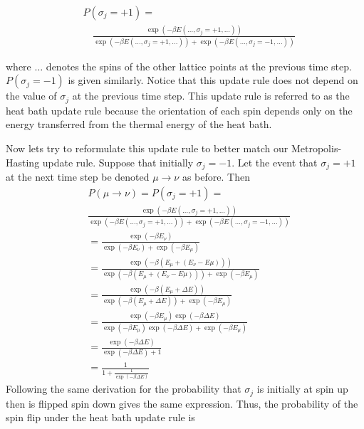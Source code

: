\documentclass{article}
\begin{document}
\begin{equation}
    \begin{split}
    &P(\sigma_j = +1) = \\
    &\quad \frac{\exp(-\beta E(\ldots, \sigma_j = +1, \ldots))}{\exp(-\beta E(\ldots, \sigma_j = +1, \ldots)) + \exp(-\beta E(\ldots, \sigma_j = -1, \ldots))}
    \end{split}
\end{equation}

where $\ldots$ denotes the spins of the other lattice points at the previous time step. $P(\sigma_j = -1)$ is given similarly. 
Notice that this update rule does not depend on the value of $\sigma_j$ at the previous time step. This update rule
is referred to as the heat bath update rule because the orientation of each spin depends only on the energy transferred from the thermal energy of the heat bath.

Now lets try to reformulate this update rule to better match our Metropolis-Hasting update rule. 
Suppose that initially $\sigma_j = -1$. Let the event that $\sigma_j = +1$ at the next time step be denoted $\mu \rightarrow \nu$ as before.
Then 
\begin{align}
    &P(\mu \rightarrow \nu) = P(\sigma_j = +1) = \\
    &\frac{\exp(-\beta E(\ldots, \sigma_j = +1, \ldots))}{\exp(-\beta E(\ldots, \sigma_j = +1, \ldots)) + \exp(-\beta E(\ldots, \sigma_j = -1, \ldots))} \\
    &= \frac{\exp(-\beta E_{\nu})}{\exp(-\beta E_{\nu}) + \exp(-\beta E_{\mu})} \\
    &= \frac{\exp(-\beta (E_{\mu} + (E_{\nu} - E{\mu})))}{\exp(-\beta (E_{\mu} + (E_{\nu} - E{\mu}))) + \exp(-\beta E_{\mu})} \\
    &= \frac{\exp(-\beta (E_{\mu} + \Delta E))}{\exp(-\beta (E_{\mu} + \Delta E)) + \exp(-\beta E_{\mu})} \\
    &= \frac{\exp(-\beta E_{\mu}) \exp(-\beta \Delta E)}{\exp(-\beta E_{\mu}) \exp(-\beta \Delta E) + \exp(-\beta E_{\mu})} \\
    &= \frac{\exp(-\beta \Delta E)}{\exp(-\beta \Delta E) + 1} \\
    &= \frac{1}{1 + \frac{1}{\exp(-\beta \Delta E)}}
\end{align}
Following the same derivation for the probability that $\sigma_j$ is initially at spin up then is flipped spin down gives the same expression.
Thus, the probability of the spin flip under the heat bath update rule is 
\end{document}
